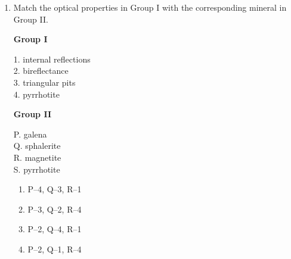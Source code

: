 \documentclass[journal,12pt,onecolumn]{IEEEtran}
\theoremstyle{remark}
\begin{document}
\begin{enumerate}
\begin{multicols}{2}
\columnbreak

\textbf{Group II}  
\begin{flushleft}
1. reefs parallel to the shore and separated by deep lagoon\\
2. broad flat topped hill capped by resistant rock and bounded by cliffs\\
3. circular reefs that rim lagoons\\
4. crescent shaped sand dunes
\end{flushleft}
\end{multicols}

\begin{multicols}{4}
\begin{enumerate}
\item P--1, Q--2, R--3  
\item P--3, Q--2, R--4  
\item P--3, Q--4, R--1  
\item P--2, Q--4, R--1  
\end{enumerate}
\end{multicols}











\item Match the optical properties in Group I with the corresponding mineral in Group II.

\begin{multicols}{2}
\textbf{Group I}  
\begin{flushleft}
1. internal reflections\\
2. bireflectance\\
3. triangular pits\\
4. pyrrhotite
\end{flushleft}

\columnbreak

\textbf{Group II}  
\begin{flushleft}
P. galena\\
Q. sphalerite\\
R. magnetite\\
S. pyrrhotite
\end{flushleft}
\end{multicols}

\begin{multicols}{4}
\begin{enumerate}
\item P--4, Q--3, R--1  
\item P--3, Q--2, R--4  
\item P--2, Q--4, R--1  
\item P--2, Q--1, R--4  
\end{enumerate}
\end{multicols}







\end{enumerate}
\end{document}
